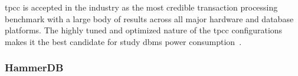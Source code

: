 \gls{tpcc} is accepted in the industry as the most credible transaction processing benchmark with a large body of results across all major hardware and database platforms. The highly tuned and optimized nature of the \gls{tpcc} configurations makes it the best candidate for study \gls{dbms} power consumption~\cite{powerconsumptiontppc}.

\subsubsection{HammerDB}
\label{sc:hammerdb}


